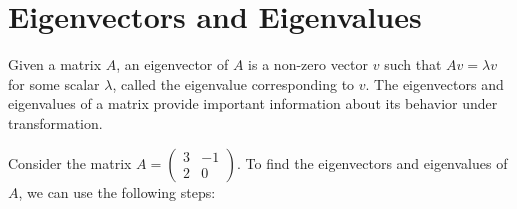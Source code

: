 \documentclass{article}
\begin{document}
\section{Eigenvectors and Eigenvalues}

Given a matrix $A$, an eigenvector of $A$ is a non-zero vector $v$ such that $Av = \lambda v$ for some scalar $\lambda$, called the eigenvalue corresponding to $v$. The eigenvectors and eigenvalues of a matrix provide important information about its behavior under transformation.

Consider the matrix $A = \begin{pmatrix} 3 & -1 \\ 2 & 0 \end{pmatrix}$. To find the eigenvectors and eigenvalues of $A$, we can use the following steps:
\end{document}
